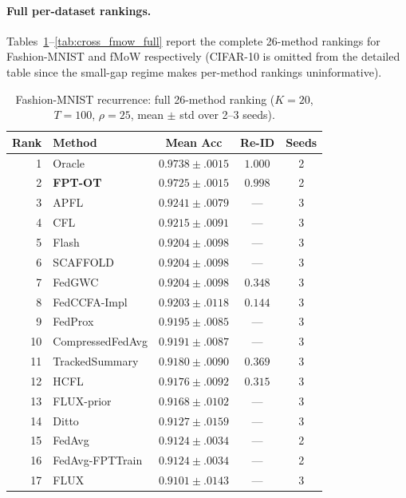 \paragraph{Full per-dataset rankings.}
Tables~\ref{tab:cross_fmnist_full}--\ref{tab:cross_fmow_full} report the complete 26-method rankings for Fashion-MNIST and fMoW respectively (CIFAR-10 is omitted from the detailed table since the small-gap regime makes per-method rankings uninformative).

\begin{table}[h]
\centering
\caption{Fashion-MNIST recurrence: full 26-method ranking ($K{=}20$, $T{=}100$, $\rho{=}25$, mean $\pm$ std over 2--3 seeds).}
\label{tab:cross_fmnist_full}
\scriptsize
\setlength{\tabcolsep}{3pt}
\begin{tabular}{rlccc}
\toprule
Rank & Method & Mean Acc & Re-ID & Seeds \\
\midrule
1  & Oracle              & $0.9738 \pm .0015$ & $1.000$ & 2 \\
2  & \textbf{FPT-OT}     & $\mathbf{0.9725 \pm .0015}$ & $0.998$ & 2 \\
\midrule
3  & APFL                & $0.9241 \pm .0079$ & — & 3 \\
4  & CFL                 & $0.9215 \pm .0091$ & — & 3 \\
5  & Flash               & $0.9204 \pm .0098$ & — & 3 \\
6  & SCAFFOLD            & $0.9204 \pm .0098$ & — & 3 \\
7  & FedGWC              & $0.9204 \pm .0098$ & $0.348$ & 3 \\
8  & FedCCFA-Impl        & $0.9203 \pm .0118$ & $0.144$ & 3 \\
9  & FedProx             & $0.9195 \pm .0085$ & — & 3 \\
10 & CompressedFedAvg    & $0.9191 \pm .0087$ & — & 3 \\
11 & TrackedSummary      & $0.9180 \pm .0090$ & $0.369$ & 3 \\
12 & HCFL                & $0.9176 \pm .0092$ & $0.315$ & 3 \\
13 & FLUX-prior          & $0.9168 \pm .0102$ & — & 3 \\
14 & Ditto               & $0.9127 \pm .0159$ & — & 3 \\
15 & FedAvg              & $0.9124 \pm .0034$ & — & 2 \\
16 & FedAvg-FPTTrain     & $0.9124 \pm .0034$ & — & 2 \\
17 & FLUX                & $0.9101 \pm .0143$ & — & 3 \\

\end{tabular}
\end{table}
